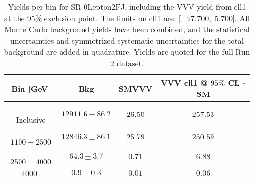 \begin{table}[!htbp]
    \small
    \center
    \begin{tabular}{c||c|c|c}
    Bin [GeV] & Bkg & SMVVV & \pbox{20cm}{VVV \\ cll1 @ $95\%$ CL - SM \\ }\\
    \hline
    \pbox{20cm}{ ~ \\Inclusive\\ } & $12911.6 \pm 86.2$ & $26.50$ & $257.53$\\
    \hline
    \pbox{20cm}{ ~ \\$1100-2500$\\ } & $12846.3 \pm 86.1$ & $25.79$ & $250.59$\\
    \hline
    \pbox{20cm}{ ~ \\$2500-4000$\\ } & $64.3 \pm 3.7$ & $0.71$ & $6.88$\\
    \hline
    \pbox{20cm}{ ~ \\$4000-$\\ } & $0.9 \pm 0.3$ & $0.01$ & $0.06$\\
\end{tabular}
    \caption{Yields per bin for SR 0Lepton2FJ, including the VVV yield from cll1 at the $95$\% exclusion point. The limits on cll1 are: [$-27.700$,~$5.700$]. All Monte Carlo background yields have been combined, and the statistical uncertainties and symmetrized systematic uncertainties for the total background are added in quadrature. Yields are quoted for the full Run 2 dataset.}
    \label{tab:0Lepton2FJ$binssignal}
\end{table}
